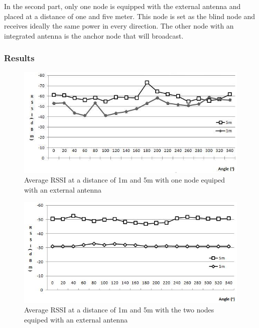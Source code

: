 In the second part, only one node is equipped with the external antenna and placed at a distance of one and five meter. This node is set as the blind node and receives ideally the same power in every direction. The other node with an integrated antenna is the anchor node that will broadcast. 

\subsubsection{Results}
\begin{figure}[h]
	\centering
		\includegraphics[scale=0.51]{Images/1and5mwithoutantenna.jpg}
	\caption{Average RSSI at a distance of 1m and 5m with one node equiped with an external antenna}
	\label{fig:1and5mnoa}
\end{figure}

\begin{figure}[h]
	\centering
		\includegraphics[scale=0.51]{Images/1and5mwithantenna.jpg}
	\caption{Average RSSI at a distance of 1m and 5m with the two nodes equiped with an external antenna}
	\label{fig:1and5mwoa}
\end{figure}

